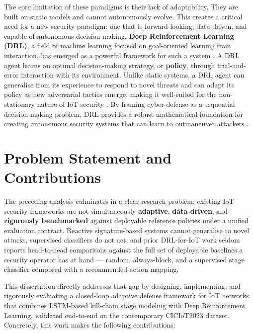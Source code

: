 The core limitation of these paradigms is their lack of adaptability. They are built on static models and cannot autonomously evolve. This creates a critical need for a new security paradigm: one that is forward-looking, data-driven, and capable of autonomous decision-making. \textbf{Deep Reinforcement Learning (DRL)}, a field of machine learning focused on goal-oriented learning from interaction, has emerged as a powerful framework for such a system \cite{Chen2021}. A DRL agent learns an optimal decision-making strategy, or \textbf{policy}, through trial-and-error interaction with its environment. Unlike static systems, a DRL agent can generalise from its experience to respond to novel threats and can adapt its policy as new adversarial tactics emerge, making it well-suited for the non-stationary nature of IoT security \cite{Sutton2018,Uprety2021}. By framing cyber-defense as a sequential decision-making problem, DRL provides a robust mathematical foundation for creating autonomous security systems that can learn to outmaneuver attackers \cite{Gueriani2023}.

\section{Problem Statement and Contributions}\label{sec:proposal_and_contributions}
The preceding analysis culminates in a clear research problem: existing IoT security frameworks are not simultaneously \textbf{adaptive}, \textbf{data-driven}, and \textbf{rigorously benchmarked} against deployable reference policies under a unified evaluation contract. Reactive signature-based systems cannot generalise to novel attacks, supervised classifiers do not act, and prior DRL-for-IoT work seldom reports head-to-head comparisons against the full set of deployable baselines a security operator has at hand --- random, always-block, and a supervised stage classifier composed with a recommended-action mapping.

This dissertation directly addresses that gap by designing, implementing, and rigorously evaluating a closed-loop adaptive defense framework for IoT networks that combines LSTM-based kill-chain stage modeling with Deep Reinforcement Learning, validated end-to-end on the contemporary CICIoT2023 dataset. Concretely, this work makes the following contributions:

